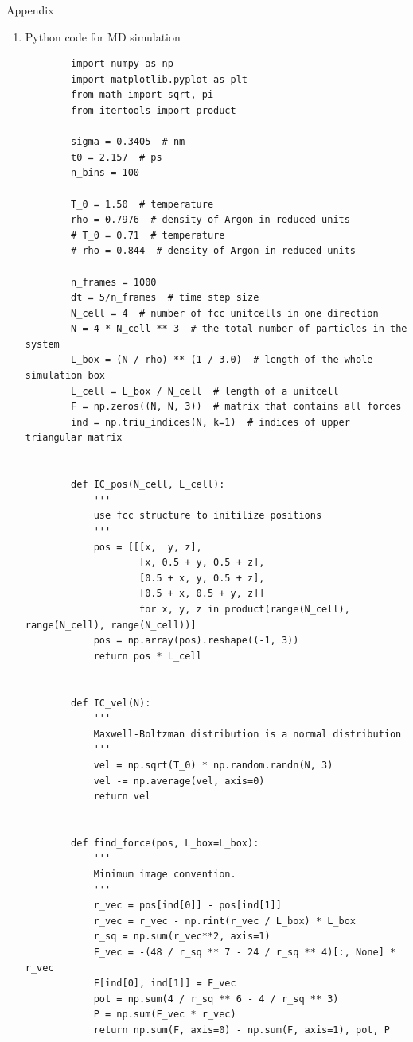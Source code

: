 \documentclass{article}
\begin{document}
\newpage
\begin{section}{Appendix}
\begin{enumerate}
	\item Python code for MD simulation
	\begin{verbatim}
        import numpy as np
        import matplotlib.pyplot as plt
        from math import sqrt, pi
        from itertools import product

        sigma = 0.3405  # nm
        t0 = 2.157  # ps
        n_bins = 100

        T_0 = 1.50  # temperature
        rho = 0.7976  # density of Argon in reduced units
        # T_0 = 0.71  # temperature
        # rho = 0.844  # density of Argon in reduced units

        n_frames = 1000
        dt = 5/n_frames  # time step size
        N_cell = 4  # number of fcc unitcells in one direction
        N = 4 * N_cell ** 3  # the total number of particles in the system
        L_box = (N / rho) ** (1 / 3.0)  # length of the whole simulation box
        L_cell = L_box / N_cell  # length of a unitcell
        F = np.zeros((N, N, 3))  # matrix that contains all forces
        ind = np.triu_indices(N, k=1)  # indices of upper triangular matrix


        def IC_pos(N_cell, L_cell):
            '''
            use fcc structure to initilize positions
            '''
            pos = [[[x,  y, z],
                    [x, 0.5 + y, 0.5 + z],
                    [0.5 + x, y, 0.5 + z],
                    [0.5 + x, 0.5 + y, z]]
                    for x, y, z in product(range(N_cell), range(N_cell), range(N_cell))]
            pos = np.array(pos).reshape((-1, 3))
            return pos * L_cell


        def IC_vel(N):
            '''
            Maxwell-Boltzman distribution is a normal distribution
            '''
            vel = np.sqrt(T_0) * np.random.randn(N, 3)
            vel -= np.average(vel, axis=0)
            return vel


        def find_force(pos, L_box=L_box):
            '''
            Minimum image convention. 
            '''
            r_vec = pos[ind[0]] - pos[ind[1]]
            r_vec = r_vec - np.rint(r_vec / L_box) * L_box
            r_sq = np.sum(r_vec**2, axis=1)
            F_vec = -(48 / r_sq ** 7 - 24 / r_sq ** 4)[:, None] * r_vec
            F[ind[0], ind[1]] = F_vec
            pot = np.sum(4 / r_sq ** 6 - 4 / r_sq ** 3)
            P = np.sum(F_vec * r_vec)
            return np.sum(F, axis=0) - np.sum(F, axis=1), pot, P



\end{verbatim}
\end{enumerate}
\end{section}
\end{document}
